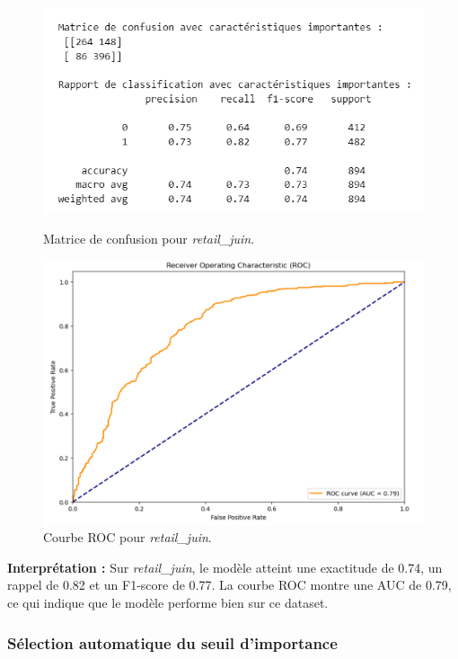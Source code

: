 \begin{figure}[H]
    \centering
    \begin{minipage}{0.45\linewidth}
        \centering
        \includegraphics[width=\linewidth]{capture_modele_14.png}
        \caption{Matrice de confusion pour \textit{retail\_juin}.}
    \end{minipage}
    \hfill
    \begin{minipage}{0.45\linewidth}
        \centering
        \includegraphics[width=\linewidth]{capture_modele_15.png}
        \caption{Courbe ROC pour \textit{retail\_juin}.}
        \label{fig:roc_juin_rf}
    \end{minipage}
\end{figure}

\textbf{Interprétation :} Sur \textit{retail\_juin}, le modèle atteint une exactitude de 0.74, un rappel de 0.82 et un F1-score de 0.77. La courbe ROC montre une AUC de 0.79, ce qui indique que le modèle performe bien sur ce dataset.
\subsubsection{Sélection automatique du seuil d'importance}

